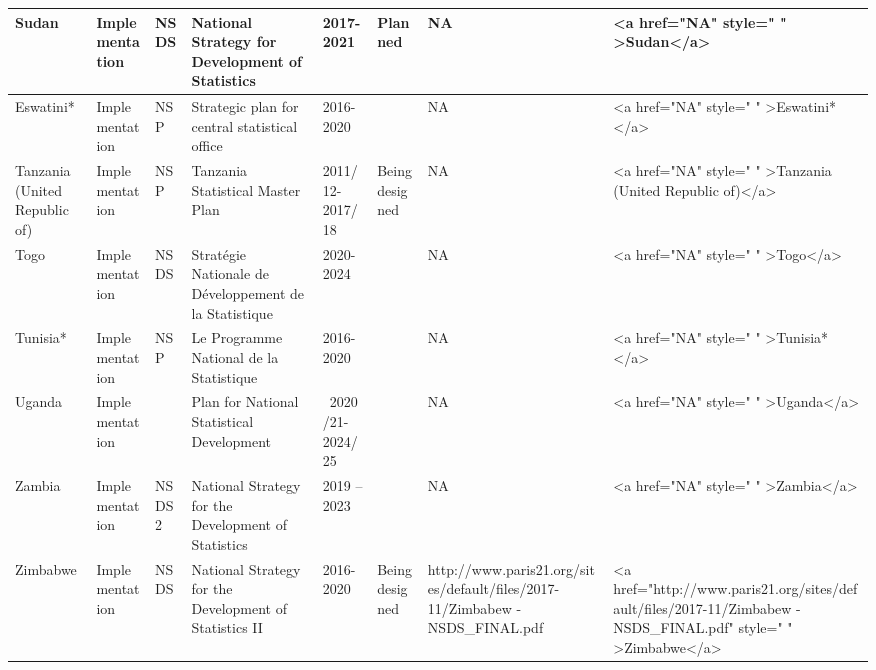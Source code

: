 \documentclass[
]{article}
\begin{document}
\begin{table}
\begin{tabular}[t]{l|l|l|l|l|l|l|l}
\hline
Sudan & Implementation & NSDS & National Strategy for Development of Statistics & 2017-2021 & Planned & NA & <a href="NA" style="     " >Sudan</a>\\
\hline
Eswatini* & Implementation & NSP & Strategic plan for central statistical office & 2016-2020 &  & NA & <a href="NA" style="     " >Eswatini*</a>\\
\hline
Tanzania (United Republic of) & Implementation & NSP & Tanzania Statistical Master Plan & 2011/12-2017/18 & Being designed & NA & <a href="NA" style="     " >Tanzania (United Republic of)</a>\\
\hline
Togo & Implementation & NSDS & Stratégie Nationale de Développement de la Statistique & 2020-2024 &  & NA & <a href="NA" style="     " >Togo</a>\\
\hline
Tunisia* & Implementation & NSP & Le Programme National de la Statistique & 2016-2020 &  & NA & <a href="NA" style="     " >Tunisia*</a>\\
\hline
Uganda & Implementation &  & Plan for National Statistical Development  &  2020/21-2024/25 &  & NA & <a href="NA" style="     " >Uganda</a>\\
\hline
Zambia & Implementation & NSDS2 & National Strategy for the Development of Statistics  & 2019 – 2023 &  & NA & <a href="NA" style="     " >Zambia</a>\\
\hline
Zimbabwe & Implementation & NSDS & National Strategy for the Development of Statistics II & 2016-2020 & Being designed & http://www.paris21.org/sites/default/files/2017-11/Zimbabew - NSDS_FINAL.pdf & <a href="http://www.paris21.org/sites/default/files/2017-11/Zimbabew - NSDS_FINAL.pdf" style="     " >Zimbabwe</a>\\
\hline
\end{tabular}
\end{table}
\end{document}
